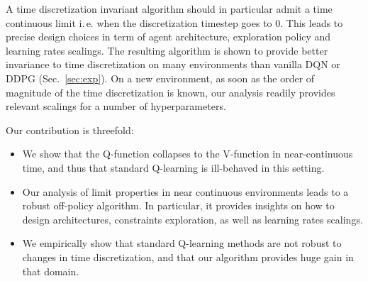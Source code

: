 A time discretization invariant algorithm should in particular admit a time
continuous limit i.\,e. when the discretization timestep goes to $0$.  This
leads to precise design choices in term of agent architecture, exploration
policy and learning rates scalings.  The resulting algorithm is shown to
provide better invariance to time discretization on many environments than
vanilla DQN or DDPG (Sec.~\ref{sec:exp}).  On a new environment, as soon as the
order of magnitude of the time discretization is known, our analysis readily
provides relevant scalings for a number of hyperparameters.


Our contribution is threefold:
\begin{itemize} 
\item We show that the Q-function collapses to the V-function in near-continuous time, and thus that
    standard Q-learning is ill-behaved in this setting.
  \item Our analysis of limit properties in near continuous environments leads to a robust off-policy algorithm. In particular,
    it provides insights on how to design architectures, constraints exploration, as well as learning rates scalings.
  \item We empirically show that standard Q-learning methods are not robust to changes in time discretization, and that our algorithm provides huge gain in that domain.
\end{itemize}


